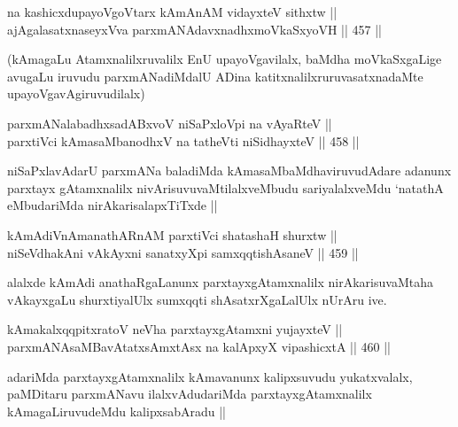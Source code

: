 \begin{shl}
na kashicxdupayoVgoV\s tarx kAmAnAM vidayxteV sithxtw || \\
ajAgalasatxnaseyxVva parxmANAdavxnadhxmoVkaSxyoVH ||  457 ||  
\end{shl}

\begin{artha}
(kAmagaLu Atamxnalilxruvalilx EnU upayoVgavilalx, baMdha moVkaSxgaLige
  avugaLu iruvudu parxmANadiMdalU ADina katitxnalilxruruvasatxnadaMte upayoVgavAgiruvudilalx)
\end{artha}

\begin{shl}
parxmANalabadhxsadABxvoV niSaPxloV\s pi na vAyaRteV || \\
parxtiVci kAmasaMbanodhxV na tatheVti niSidhayxteV ||  458 ||  
\end{shl}

\begin{artha}
niSaPxlavAdarU parxmANa baladiMda kAmasaMbaMdhaviruvudAdare adanunx
parxtayx gAtamxnalilx nivArisuvuvaMtilalxveMbudu sariyalalxveMdu
`natathA eMbudariMda nirAkarisalapxTiTxde ||
\end{artha}


\begin{shl}
kAmAdiVnAmanathARnAM parxtiVci shatashaH shurxtw || \\
niSeVdhakAni vAkAyxni sanatxyXpi samxqqtishAsaneV ||  459 ||  
\end{shl}

\begin{artha}
alalxde kAmAdi anathaRgaLanunx parxtayxgAtamxnalilx nirAkarisuvaMtaha
vAkayxgaLu shurxtiyalUlx sumxqqti shAsatxrXgaLalUlx nUrAru ive.
\end{artha}



\begin{shl}
kAmakalxqqpitxratoV neVha parxtayxgAtamxni yujayxteV || \\
parxmANAsaMBavAtatxsAmxtAsx na kalApxyX vipashicxtA ||  460 ||  
\end{shl}

\begin{artha}
adariMda parxtayxgAtamxnalilx kAmavanunx kalipxsuvudu yukatxvalalx,
paMDitaru parxmANavu ilalxvAdudariMda parxtayxgAtamxnalilx
kAmagaLiruvudeMdu kalipxsabAradu ||
\end{artha}

